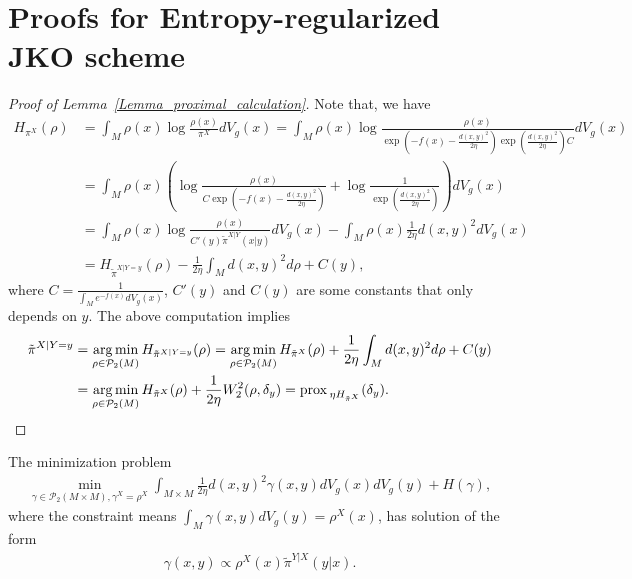\section{Proofs for Entropy-regularized JKO scheme}\label{Proof_Theorem_Gaussian_JKO}

\begin{proof}[Proof of Lemma~\ref{Lemma_proximal_calculation}] Note that, we have
    \begin{align*}
        H_{\pi^{X}}(\rho) &= \int_{M} \rho(x) \log \frac{\rho(x)}{\pi^{X}} dV_{g}(x)
        = \int_{M} \rho(x) \log \frac{\rho(x)}{\exp(-f(x) - \frac{d(x, y)^{2}}{2\eta})\exp(\frac{d(x, y)^{2} }{2\eta}) C} dV_{g}(x) \\
        &= \int_{M} \rho(x) (\log \frac{\rho(x)}{C\exp(-f(x) - \frac{d(x, y)^{2}}{2\eta})} + \log \frac{1}{\exp(\frac{d(x, y)^{2}}{2\eta})} ) dV_{g}(x) \\
        &= \int_{M} \rho(x) \log \frac{\rho(x)}{C'(y) \tilde{\pi}^{X|Y}(x|y)} dV_{g}(x)
        - \int_{M} \rho(x) \frac{1}{2\eta} d(x, y)^{2} dV_{g}(x) \\
        &= H_{\tilde{\pi}^{X|Y = y}}(\rho) - \frac{1}{2\eta} \int_{M} d(x, y)^{2}d\rho + C(y),
\end{align*}
where $C= \frac{1}{\int_{M} e^{-f(x)} dV_{g}(x) }$,
$C'(y)$ and $C(y)$ are some constants that only depends on $y$. 
The above computation implies 
\begin{align*}
        \tilde{\pi}^{X|Y = y} &= \operatorname*{arg\,min}_{\rho \in \mathcal{P}_{2}(M)} H_{\tilde{\pi}^{X|Y = y}}(\rho)
        = \operatorname*{arg\,min}_{\rho \in \mathcal{P}_{2}(M)} H_{\tilde{\pi}^{X}}(\rho) + \frac{1}{2\eta} \int_{M} d(x, y)^{2}d\rho + C(y) \\
        &= \operatorname*{arg\,min}_{\rho \in \mathcal{P}_{2}(M)} H_{\tilde{\pi}^{X}}(\rho) + \frac{1}{2\eta} W_{2}^{2}(\rho, \delta_{y}) = \operatorname{prox\,}_{\eta H_{\tilde{\pi}^{X}}} (\delta_{y}).
\end{align*}
\end{proof}

\begin{lemma}\label{lemtemp2}
    The minimization problem 
    \begin{align*}
        \min_{
            \gamma \in \mathcal{P}_{2}(M \times M),
            \gamma^{X} = \rho^{X}
        } \int_{M \times M}\frac{1}{2\eta} d(x, y)^{2} \gamma (x, y) dV_{g}(x) dV_{g}(y) 
        + H(\gamma),
    \end{align*}
    where the constraint means $\int_{M} \gamma(x, y) dV_{g}(y) = \rho^{X}(x)$, 
    has solution of the form 
    \begin{align*}
        \gamma(x, y) \propto \rho^{X}(x) \tilde{\pi}^{Y|X}(y|x).
    \end{align*}
\end{lemma}

